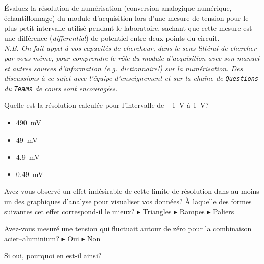 \documentclass[canadien,12pt,oneside,letterpaper]{article}
\begin{document}
\begin{gradescope}
\item Évaluez la résolution de numérisation (conversion analogique-numérique, échantillonnage) du module d'acquisition lors d'une mesure de tension pour le plus petit intervalle utilisé pendant le laboratoire, sachant que cette mesure est une différence (\textit{differential}) de potentiel entre deux points du circuit.\\ \textit{\footnotesize N.B. On fait appel à vos capacités de chercheur, dans le sens littéral de chercher par vous-même, pour comprendre le rôle du module d'acquisition avec son manuel et autres sources d'information (\emph{e.g.} dictionnaire!) sur la numérisation. Des discussions à ce sujet avec l'équipe d'enseignement et sur la chaîne de \texttt{Questions} du \texttt{Teams} de cours sont encouragées.}
    \begin{gradescope}
    \item Quelle est la résolution calculée pour l'intervalle de \qty{-1}{\volt} à \qty{1}{\volt}?
        \begin{itemize}[label=$\blacktriangleright$]
        \item \qty{490}{\mV}
        \item \qty{49}{\mV}
        \item \qty{4.9}{\mV}
        \item \qty{0.49}{\mV}
        \end{itemize}
    \item Avez-vous observé un effet indésirable de cette limite de résolution dans au moins un des graphiques d'analyse pour visualiser vos données? À laquelle des formes suivantes cet effet correspond-il le mieux? $\blacktriangleright$ Triangles $\blacktriangleright$ Rampes $\blacktriangleright$ Paliers %
    \end{gradescope}
    \begin{gradescope}
    \setcounter{gradescopei}{2}
    \item Avez-vous mesuré une tension qui fluctuait autour de zéro pour la combinaison acier--aluminium? $\blacktriangleright$ Oui $\blacktriangleright$ Non
    \item Si oui, pourquoi en est-il ainsi?
        \begin{itemize}[label=$\blacktriangleright$]

\end{itemize}
\end{gradescope}
\end{gradescope}
\end{document}
